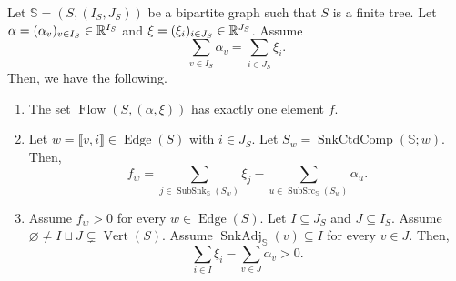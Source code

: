 \begin{lemma}\label{lem:tree-flow-cut}
Let $\mathbb S=(S,(I_S,J_S))$ be a bipartite graph such that $S$ is a finite tree.
Let $\alpha=(\alpha_v)_{v\in I_S}\in\mathbb R^{I_S}$ and
$\xi=(\xi_i)_{i\in J_S}\in\mathbb R^{J_S}$.
Assume
\begin{equation}\label{eq:tree-vertex-sum-balance}
 \sum_{v\in I_{S}}\alpha_v
 =\sum_{i\in J_{S}}\xi_i.
\end{equation}
Then, we have the following.

\begin{enumerate}
\item\label{c:tree-flow-existence} The set $\operatorname{Flow}(S,(\alpha,\xi))$ has exactly one element $f$.
\item\label{c:tree-flow-cut} Let $w=\llbracket v,i\rrbracket\in\operatorname{Edge}(S)$
with $i\in J_{S}$.
Let $S_w=\operatorname{SnkCtdComp}(\mathbb S;w)$.
Then,
\[
 f_w=\sum_{j\in \operatorname{SubSnk}_{\mathbb S}(S_w)}\xi_j
      -\sum_{u\in \operatorname{SubSrc}_{\mathbb S}(S_w)}\alpha_u.
\]
\item\label{c:tree-flow-positive-boundary} Assume $f_w>0$ for every $w\in\operatorname{Edge}(S)$.
Let $I\subseteq J_{S}$ and $J\subseteq I_{S}$.
Assume $\varnothing\ne I\sqcup J\subsetneq\operatorname{Vert}(S)$.
Assume $\operatorname{SnkAdj}_{\mathbb S}(v)\subseteq I$ for every $v\in J$.
Then,
\[
 \sum_{i\in I}\xi_i-\sum_{v\in J}\alpha_v>0.
\]
\end{enumerate}
\end{lemma}
